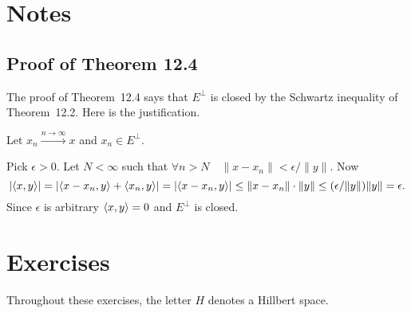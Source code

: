 
\section{Notes}

\subsection{Proof of Theorem 12.4}


The proof of Theorem~12.4 says that \(E^\perp\) is closed by the
Schwartz inequality of Theorem~12.2. Here is the justification.

Let \(x_n \xrightarrow{n\to \infty} x\) and \(x_n \in E^\perp\).

Pick \(\epsilon > 0\). Let \(N<\infty\) such that
\(\forall n>N \quad \|x-x_n\| < \epsilon/\|y\|\).
Now
\begin{equation*}
|\langle x, y \rangle| = |\langle x-x_n, y \rangle + \langle x_n, y \rangle| =
  |\langle x-x_n, y \rangle| 
 \leq \|x - x_n\|\cdot \|y\| \leq (\epsilon/\|y\|)\|y\| = \epsilon.
\end{equation*}
Since \(\epsilon\) is arbitrary \(\langle x,y \rangle = 0\) and \(E^\perp\) is closed.

\section{Exercises} %

Throughout these exercises, the letter $H$ denotes a Hillbert space.

